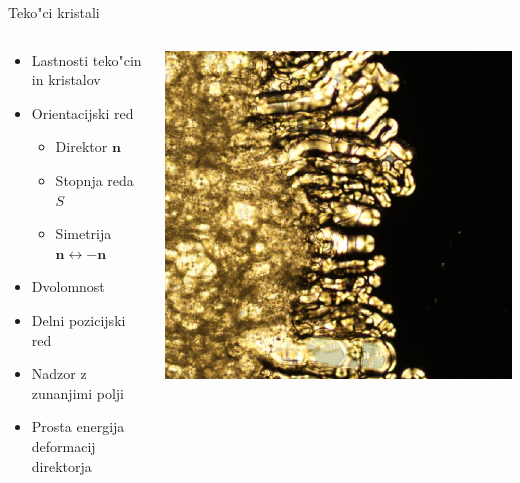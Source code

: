 \documentclass{beamer}
\renewcommand{\vec}{\mathbf}
\begin{document}
\begin{frame}{Teko"ci kristali}
 \begin{columns}[c]
  \begin{column}{.5\textwidth}
  
   \begin{itemize}
    \item Lastnosti teko"cin in kristalov
    \item Orientacijski red
      \begin{itemize}
	\item Direktor $\vec n$
	\item Stopnja reda $S$
	\item Simetrija $\vec n \leftrightarrow -\vec n$
      \end{itemize}
    \item Dvolomnost
    \item Delni pozicijski red
    \item Nadzor z zunanjimi polji
    \item Prosta energija deformacij direktorja
   \end{itemize}
  \end{column}

  \begin{column}{.5\textwidth}
    \includegraphics[width=.9\textwidth]{./Slike/tvorjenje2}
  \end{column}
    
  \end{columns}
\end{frame}
\end{document}
